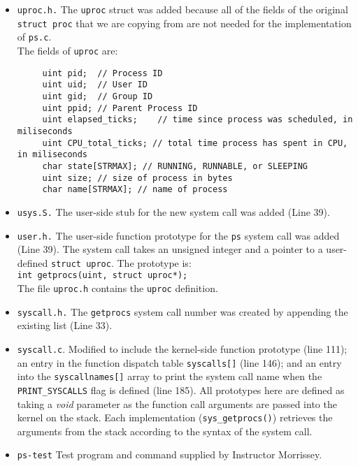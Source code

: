 \documentclass[11pt,letterpaper]{report}
\begin{document}
\begin{itemize}
	 \item {\tt uproc.h.} The {\tt uproc} struct was added because all of the fields of the original {\tt struct proc} that we are copying from are not needed for the implementation of {\tt ps.c}. \\
	 The fields of {\tt uproc} are:
	 \begin{verbatim}
	 uint pid;	// Process ID
	 uint uid;	// User ID
	 uint gid;	// Group ID
	 uint ppid;	// Parent Process ID
	 uint elapsed_ticks;	// time since process was scheduled, in miliseconds
	 uint CPU_total_ticks; // total time process has spent in CPU, in miliseconds
	 char state[STRMAX]; // RUNNING, RUNNABLE, or SLEEPING
	 uint size; // size of process in bytes
	 char name[STRMAX]; // name of process
	 \end{verbatim}
	 
	 \item {\tt usys.S.} The user-side stub for the new system call was added ({\color{red}Line 39}).
	 
	 \item {\tt user.h.} The user-side function prototype for the {\tt ps} system call was added ({\color{red}Line 39}). The system call takes an unsigned integer and a pointer to a user-defined {\tt struct uproc}. The prototype is:\\
	 {\tt int getprocs(uint, struct uproc*);}\\
	 The file {\tt uproc.h} contains the {\tt uproc} definition.
	 
	 \item {\tt syscall.h.} The {\tt getprocs} system call number was created by appending the existing list ({\color{red}Line 33}).
	 
	 \item {\tt syscall.c}. Modified to include the kernel-side function prototype ({\color{red}line 111}); an entry in the function dispatch table {\tt syscalls[]} ({\color{red}line 146}); and an entry into the {\tt syscallnames[]} array to print the system call name when the {\tt PRINT\_SYSCALLS} flag is defined ({\color{red}line 185}). All prototypes here are defined as taking a \emph{void} parameter as the function call arguments are passed into the kernel on the stack. Each implementation ({\tt sys\_getprocs()}) retrieves the arguments from the stack according to the syntax of the system call.
	 
	 \item {\tt ps-test} Test program and command supplied by Instructor Morrissey.
	
	\end{itemize}
\end{document}
